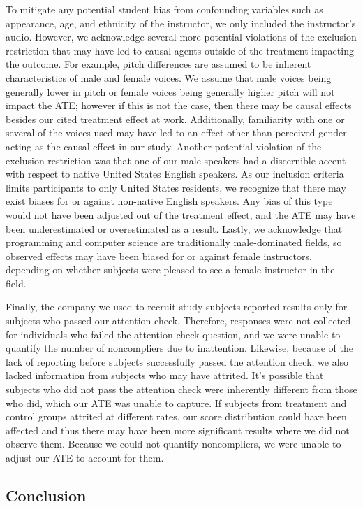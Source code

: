 \documentclass[
]{article}
\begin{document}
To mitigate any potential student bias from confounding variables such
as appearance, age, and ethnicity of the instructor, we only included
the instructor's audio. However, we acknowledge several more potential
violations of the exclusion restriction that may have led to causal
agents outside of the treatment impacting the outcome. For example,
pitch differences are assumed to be inherent characteristics of male and
female voices. We assume that male voices being generally lower in pitch
or female voices being generally higher pitch will not impact the ATE;
however if this is not the case, then there may be causal effects
besides our cited treatment effect at work. Additionally, familiarity
with one or several of the voices used may have led to an effect other
than perceived gender acting as the causal effect in our study. Another
potential violation of the exclusion restriction was that one of our
male speakers had a discernible accent with respect to native United
States English speakers. As our inclusion criteria limits participants
to only United States residents, we recognize that there may exist
biases for or against non-native English speakers. Any bias of this type
would not have been adjusted out of the treatment effect, and the ATE
may have been underestimated or overestimated as a result. Lastly, we
acknowledge that programming and computer science are traditionally
male-dominated fields, so observed effects may have been biased for or
against female instructors, depending on whether subjects were pleased
to see a female instructor in the field.

Finally, the company we used to recruit study subjects reported results
only for subjects who passed our attention check. Therefore, responses
were not collected for individuals who failed the attention check
question, and we were unable to quantify the number of noncompliers due
to inattention. Likewise, because of the lack of reporting before
subjects successfully passed the attention check, we also lacked
information from subjects who may have attrited. It's possible that
subjects who did not pass the attention check were inherently different
from those who did, which our ATE was unable to capture. If subjects
from treatment and control groups attrited at different rates, our score
distribution could have been affected and thus there may have been more
significant results where we did not observe them. Because we could not
quantify noncompliers, we were unable to adjust our ATE to account for
them.

\hypertarget{conclusion}{%
\subsection{Conclusion}\label{conclusion}}
\end{document}
